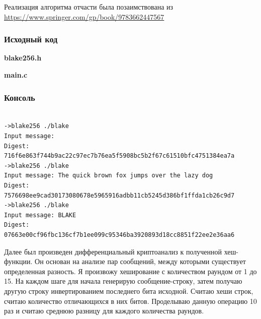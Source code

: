 \documentclass[12pt]{article}
\begin{document}
Реализация алгоритма отчасти была позаимствована из \url{https://www.springer.com/gp/book/9783662447567}

\subsubsection*{Исходный код}


 
\textbf{blake256.h}


\textbf{main.c}


\subsubsection*{Консоль}
\begin{lstlisting}

->blake256 ./blake 
Input message: 
Digest: 716f6e863f744b9ac22c97ec7b76ea5f5908bc5b2f67c61510bfc4751384ea7a
->blake256 ./blake 
Input message: The quick brown fox jumps over the lazy dog
Digest: 7576698ee9cad30173080678e5965916adbb11cb5245d386bf1ffda1cb26c9d7
->blake256 ./blake
Input message: BLAKE
Digest: 07663e00cf96fbc136cf7b1ee099c95346ba3920893d18cc8851f22ee2e36aa6

\end{lstlisting}

\par
Далее был произведен дифференциальный криптоанализ к полученной хеш-функции. Он основан на анализе пар сообщений, между которыми существует определенная разность. Я произвожу хеширование с количеством раундом от 1 до 15. На каждом шаге для начала генерирую сообщение-строку, затем получаю другую строку инвертированием последнего бита исходной. Считаю хеши строк, считаю количество отличающихся в них битов. Проделываю данную операцию 10 раз и считаю среднюю разницу для каждого количества раундов.  
\\
\end{document}
